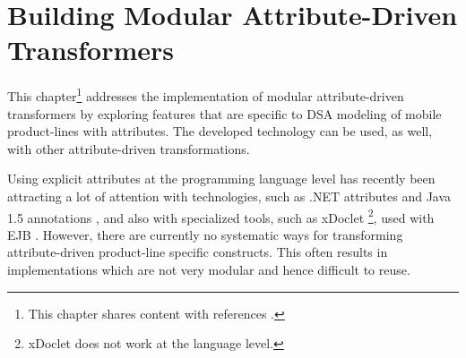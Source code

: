 
\chapter{Building Modular Attribute-Driven Transformers}
\label{ch:tango}
\label{ch04}

\noindent This chapter\footnote{This chapter shares content with references \cite{cepa.tango.ICSR8,cepa.mezini.gpce.04,cepa.mezini.hicss38,cepa.2006}.} addresses the implementation of modular attribute-driven transformers by exploring features that are specific to DSA modeling of mobile product-lines with attributes. The developed technology can be used, as well, with other attribute-driven transformations.

Using explicit attributes at the programming language level has recently been attracting a lot of attention with technologies, such as .NET attributes \cite{design.attrib} and Java 1.5 annotations \cite{www.java.attrib.04}, and also with specialized tools, such as xDoclet \cite{www.xDoclet}\footnote{xDoclet does not work at the language level.}, used with EJB \cite{www.ejb}. However, there are currently no systematic ways for transforming attribute-driven product-line specific constructs. This often results in implementations which are not very modular and hence difficult to reuse.

\begin{figure}[ht]
\end{figure}

